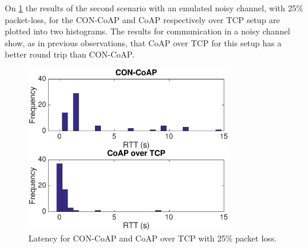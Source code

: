 


On \figurename{\ref{fig:latencynoisy}} the results of the second scenario with an emulated noisy channel, with 25\% packet-loss, for the CON-CoAP and CoAP respectively over TCP setup are plotted into two histograms.
The results for communication in a noisy channel show, as in previous observations, that CoAP over TCP for this setup has a better round trip than CON-CoAP. %
\begin{figure}[bht]
	\centering
	\includegraphics[width=3.5in]{gfx/latencynoise}
	\caption{Latency for CON-CoAP and CoAP over TCP with 25\% packet loss.}
	\label{fig:latencynoisy}
\end{figure}

